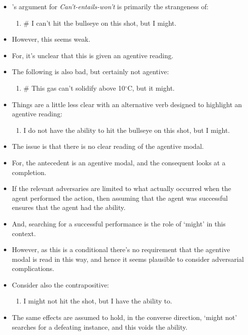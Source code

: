 \documentclass[10pt]{article}
\begin{document}
\begin{itemize}
\item \citeauthor{Boylan:2020aa}'s argument for \emph{Can't-entails-won't} is primarily the strangeness of:
  \begin{enumerate}
  \item \# I can't hit the bullseye on this shot, but I might.
  \end{enumerate}
\item However, this seems weak.
\item For, it's unclear that this is given an agentive reading.
\item The following is also bad, but certainly not agentive:
  \begin{enumerate}
  \item \# This gas can't solidify above 10\(^{{\circ}}\)C, but it might.
  \end{enumerate}
\item Things are a little less clear with an alternative verb designed to highlight an agentive reading:
  \begin{enumerate}
  \item I do not have the ability to hit the bullseye on this shot, but I might.
  \end{enumerate}
\item The issue is that there is no clear reading of the agentive modal.
\item For, the antecedent is an agentive modal, and the consequent looks at a completion.
\item If the relevant adversaries are limited to what actually occurred when the agent performed the action, then assuming that the agent was successful ensures that the agent had the ability.
\item And, searching for a successful performance is the role of `might' in this context.
\item However, as this is a conditional there's no requirement that the agentive modal is read in this way, and hence it seems plausible to consider adversarial complications.
\item Consider also the contrapositive:
  \begin{enumerate}
  \item I might not hit the shot, but I have the ability to.
  \end{enumerate}
\item The same effects are assumed to hold, in the converse direction, `might not' searches for a defeating instance, and this voids the ability.

\end{itemize}
\end{document}
